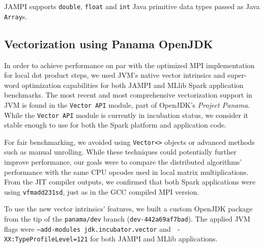 \documentclass[fleqn,10pt]{SelfArx} %
\begin{document}
JAMPI supports \texttt{double}, \texttt{float} and \texttt{int} Java primitive data types passed as Java \texttt{Array}s.


\subsection{Vectorization using Panama OpenJDK} %
\label{sub:vector_panama}

In order to achieve performance on par with the optimized MPI implementation for local dot product steps, we used JVM's native vector intrinsics and super-word optimization capabilities for both JAMPI and MLlib Spark application benchmarks. The most recent and most comprehensive vectorization support in JVM is found in the \texttt{Vector API} module, part of OpenJDK's \emph{Project Panama}. While the \texttt{Vector API} module is currently in incubation status, we consider it stable enough to use for both the Spark platform and application code.

For fair benchmarking, we avoided using \texttt{Vector<>} objects or advanced methods such as manual unrolling. While these techniques could potentially further improve performance, our goals were to compare the distributed algorithms' performance with the same CPU opcodes used in local matrix multiplications. From the JIT compiler outputs, we confirmed that both Spark applications were using \texttt{vfmadd231sd}, just as in the GCC compiled MPI version.

To use the new vector intrinsics' features, we built a custom OpenJDK package from the tip of the \texttt{panama/dev} branch (\texttt{dev-442a69af7bad}). The applied JVM flags were \texttt{--add-modules jdk.incubator.vector} and \texttt{ -XX:TypeProfileLevel=121} for both JAMPI and MLlib applications. 

\end{document}

